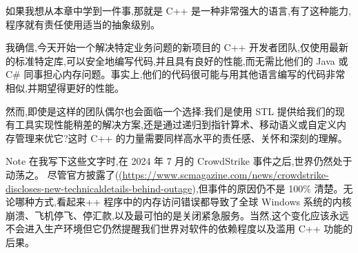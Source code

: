 如果我想从本章中学到一件事,那就是 C++ 是一种非常强大的语言,有了这种能力,程序就有责任使用适当的抽象级别。

我确信,今天开始一个解决特定业务问题的新项目的 C++ 开发者团队,仅使用最新的标准特定库,可以安全地编写代码,并且具有良好的性能,而无需比他们的 Java 或 C\# 同事担心内存问题。事实上,他们的代码很可能与用其他语言编写的代码非常相似,并期望得更好的性能。

然而,即使是这样的团队偶尔也会面临一个选择:我们是使用 STL 提供给我们的现有工具实现性能稍差的解决方案,还是通过递归到指针算术、移动语义或自定义内存管理来优它?这时 C++ 的力量需要同样高水平的责任感、关怀和深刻的理解。

\begin{myNotic}{Note}
在我写下这些文字时,在 2024 年 7 月的 CrowdStrike 事件之后,世界仍然处于动荡之。 尽管官方披露了(\url{(https://www.scmagazine.com/news/crowdstrike-discloses-new-technicaldetails-behind-outage}),但事件的原因仍不是 100\% 清楚。无论哪种方式,看起来++ 程序中的内存访问错误都导致了全球 Windows 系统的内核崩溃、飞机停飞、停汇款,以及最可怕的是关闭紧急服务。当然,这个变化应该永远不会进入生产环境但它仍然提醒我们世界对软件的依赖程度以及滥用 C++ 功能的后果。
\end{myNotic}